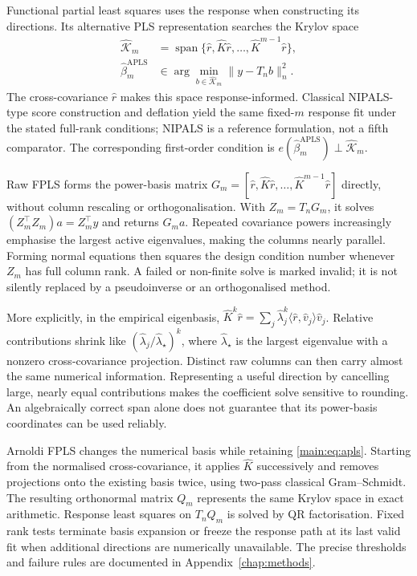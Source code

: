 Functional partial least squares uses the response when constructing its
directions. Its alternative PLS representation searches the Krylov space
\parencite{delaigle_hall_2012}
\begin{equation}
 \begin{aligned}
 \widehat{\mathcal K}_m
 &=\operatorname{span}\{\widehat r,\widehat K\widehat r,
       \ldots,\widehat K^{m-1}\widehat r\},\\
 \widehat\beta_m^{\mathrm{APLS}}
 &\in\arg\min_{b\in\widehat{\mathcal K}_m}\|y-T_nb\|_n^2.
 \end{aligned}
 \label{main:eq:apls}
\end{equation}
The cross-covariance $\widehat r$ makes this space response-informed.
Classical NIPALS-type score construction and deflation yield the same
fixed-$m$ response fit under the stated full-rank conditions; NIPALS is a
reference formulation, not a fifth comparator. The corresponding
first-order condition is
$e(\widehat\beta_m^{\mathrm{APLS}})\perp\widehat{\mathcal K}_m$.

Raw FPLS forms the power-basis matrix
$G_m=[\widehat r,\widehat K\widehat r,\ldots,
\widehat K^{m-1}\widehat r]$ directly, without column rescaling or
orthogonalisation. With $Z_m=T_nG_m$, it solves
$(Z_m^\top Z_m)a=Z_m^\top y$ and returns $G_ma$.
Repeated covariance powers increasingly emphasise the largest active
eigenvalues, making the columns nearly parallel. Forming normal equations
then squares the design condition number whenever $Z_m$ has full column
rank. A failed or non-finite solve is marked invalid; it is not silently
replaced by a pseudoinverse or an orthogonalised method.

More explicitly, in the empirical eigenbasis,
$\widehat K^k\widehat r=\sum_j\widehat\lambda_j^k
\langle\widehat r,\widehat v_j\rangle\widehat v_j$.
Relative contributions shrink like
$(\widehat\lambda_j/\widehat\lambda_\star)^k$, where
$\widehat\lambda_\star$ is the largest eigenvalue with a nonzero
cross-covariance projection. Distinct raw columns can then carry almost
the same numerical information. Representing a useful direction by
cancelling large, nearly equal contributions makes the coefficient solve
sensitive to rounding. An algebraically correct span alone does not
guarantee that its power-basis coordinates can be used reliably.

Arnoldi FPLS changes the numerical basis while retaining
\eqref{main:eq:apls}. Starting from the normalised cross-covariance, it
applies $\widehat K$ successively and removes projections onto the existing
basis twice, using two-pass classical Gram--Schmidt. The resulting
orthonormal matrix $Q_m$ represents the same Krylov space in exact
arithmetic. Response least squares on $T_nQ_m$ is solved by QR
factorisation. Fixed rank tests terminate basis expansion or freeze the
response path at its last valid fit when additional directions are
numerically unavailable. The precise thresholds and failure rules are
documented in Appendix~\ref{chap:methods}.

